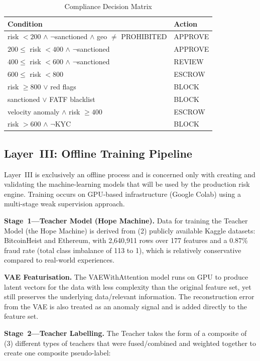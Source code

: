 \documentclass[journal]{IEEEtran}
\begin{document}
\begin{table}[!t]
\centering
\caption{Compliance Decision Matrix}
\label{tab:decision_matrix}
\begin{tabular}{p{5.2cm}l}
\toprule
\textbf{Condition} & \textbf{Action} \\
\midrule
risk $< 200$ $\land$ $\neg$sanctioned $\land$ geo $\neq$ PROHIBITED & APPROVE \\
$200 \leq$ risk $< 400$ $\land$ $\neg$sanctioned & APPROVE \\
$400 \leq$ risk $< 600$ $\land$ $\neg$sanctioned & REVIEW \\
$600 \leq$ risk $< 800$ & ESCROW \\
risk $\geq 800$ $\lor$ red flags & BLOCK \\
sanctioned $\lor$ FATF blacklist & BLOCK \\
velocity anomaly $\land$ risk $\geq 400$ & ESCROW \\
risk $> 600$ $\land$ $\neg$KYC & BLOCK \\
\bottomrule
\end{tabular}
\end{table}

\subsection{Layer~III: Offline Training Pipeline}

Layer~III is exclusively an offline process and is concerned only with creating and validating the machine-learning models that will be used by the production risk engine. Training occurs on GPU-based infrastructure (Google Colab) using a multi-stage weak supervision approach.

\textbf{Stage~1---Teacher Model (Hope Machine).} Data for training the Teacher Model (the Hope Machine) is derived from (2) publicly available Kaggle datasets: BitcoinHeist and Ethereum, with 2,640,911 rows over 177 features and a 0.87\% fraud rate (total class imbalance of 113 to 1), which is relatively conservative compared to real-world experiences.

\textbf{VAE Featurisation.} The VAEWithAttention model runs on GPU to produce latent vectors for the data with less complexity than the original feature set, yet still preserves the underlying data/relevant information. The reconstruction error from the VAE is also treated as an anomaly signal and is added directly to the feature set.

\textbf{Stage~2---Teacher Labelling.} The Teacher takes the form of a composite of (3) different types of teachers that were fused/combined and weighted together to create one composite pseudo-label:
\end{document}
